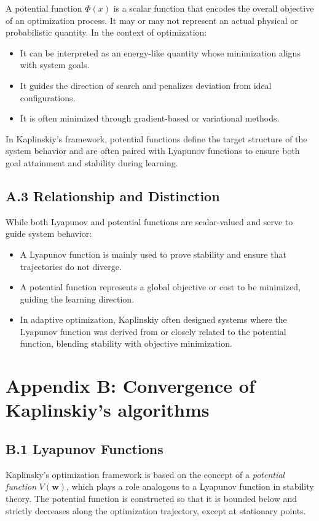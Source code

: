 \documentclass[12pt]{article}
\begin{document}
A potential function \( \Phi(x) \) is a scalar function that encodes the overall objective of an optimization process. It may or may not represent an actual physical or probabilistic quantity. In the context of optimization:
\begin{itemize}
  \item It can be interpreted as an energy-like quantity whose minimization aligns with system goals.
  \item It guides the direction of search and penalizes deviation from ideal configurations.
  \item It is often minimized through gradient-based or variational methods.
\end{itemize}
In Kaplinskiy’s framework, potential functions define the target structure of the system behavior and are often paired with Lyapunov functions to ensure both goal attainment and stability during learning.

\subsection*{A.3 Relationship and Distinction}

While both Lyapunov and potential functions are scalar-valued and serve to guide system behavior:
\begin{itemize}
  \item A Lyapunov function is mainly used to prove stability and ensure that trajectories do not diverge.
  \item A potential function represents a global objective or cost to be minimized, guiding the learning direction.
  \item In adaptive optimization, Kaplinskiy often designed systems where the Lyapunov function was derived from or closely related to the potential function, blending stability with objective minimization.
\end{itemize}

\section*{Appendix B: Convergence of Kaplinskiy's algorithms}

\subsection*{B.1 Lyapunov Functions}



Kaplinsky's optimization framework is based on the concept of a \emph{potential function} $V(\mathbf{w})$, which plays a role analogous to a Lyapunov function in stability theory. The potential function is constructed so that it is bounded below and strictly decreases along the optimization trajectory, except at stationary points.
\end{document}
